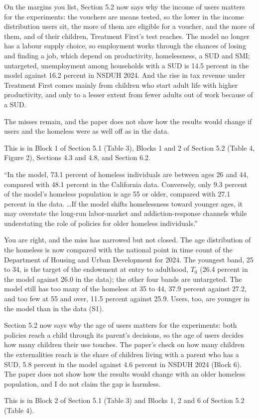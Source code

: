 \documentclass[11pt]{article}
\begin{document}
\begin{response}
On the margins you list, Section 5.2 now says why the income of users matters for
the experiments: the vouchers are means tested, so the lower in the income
distribution users sit, the more of them are eligible for a voucher, and the more
of them, and of their children, Treatment First's test reaches. The model no
longer has a labour supply choice, so employment works through the chances of
losing and finding a job, which depend on productivity, homelessness, a SUD and
SMI; untargeted, unemployment among households with a SUD is 14.5 percent in the
model against 16.2 percent in NSDUH 2024. And the rise in tax revenue under
Treatment First comes mainly from children who start adult life with higher
productivity, and only to a lesser extent from fewer adults out of work because of
a SUD.

\open The misses remain, and the paper does not show how the results would change
if users and the homeless were as well off as in the data.

This is in Block 1 of Section 5.1 (Table 3), Blocks 1 and 2 of Section 5.2 (Table
4, Figure 2), Sections 4.3 and 4.8, and Section 6.2.
\end{response}

\begin{referee}
``In the model, 73.1 percent of homeless individuals are between ages 26 and 44,
compared with 48.1 percent in the California data. Conversely, only 9.3 percent of
the model's homeless population is age 55 or older, compared with 27.1 percent in
the data. \dots If the model shifts homelessness toward younger ages, it may
overstate the long-run labor-market and addiction-response channels while
understating the role of policies for older homeless individuals.''
\end{referee}
\begin{response}
\concede You are right, and the miss has narrowed but not closed. The age
distribution of the homeless is now compared with the national point in time
count of the Department of Housing and Urban Development for 2024. The
youngest band, 25 to 34, is the target of the endowment at entry to adulthood,
$T_0$ (26.4 percent in the model against 26.0 in the data); the other four bands
are untargeted. The model still has too many of the homeless at 35 to 44, 37.9
percent against 27.2, and too few at 55 and over, 11.5 percent against 25.9.
Users, too, are younger in the model than in the data (S1).

Section 5.2 now says why the age of users matters for the experiments: both
policies reach a child through its parent's decisions, so the age of users
decides how many children their use touches. The paper's check on how many children the
externalities reach is the share of children living with a parent who has a SUD,
5.8 percent in the model against 4.6 percent in NSDUH 2024 (Block 6). \open The
paper does not show how the results would change with an older homeless
population, and I do not claim the gap is harmless.

This is in Block 2 of Section 5.1 (Table 3) and Blocks 1, 2 and 6 of Section 5.2
(Table 4).
\end{response}
\end{document}
